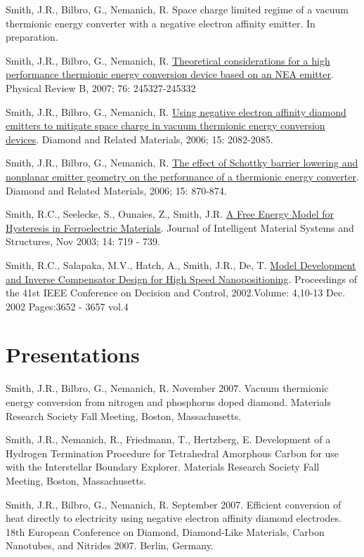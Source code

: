 \documentclass[letterpaper,margin,line]{res}
\begin{document}
\begin{resume}
Smith, J.R., Bilbro, G., Nemanich, R. Space charge limited regime of a vacuum thermionic energy converter with a negative electron affinity emitter. In preparation.

Smith, J.R., Bilbro, G., Nemanich, R. \href{http://dx.doi.org/10.1103/PhysRevB.76.245327}{Theoretical considerations for a high performance thermionic energy conversion device based on an NEA emitter}. Physical Review B, 2007; 76: 245327-245332

Smith, J.R., Bilbro, G., Nemanich, R. \href{http://dx.doi.org/10.1016/j.diamond.2006.09.011}{Using negative electron affinity diamond emitters to mitigate space charge in vacuum thermionic energy conversion devices}. Diamond and Related Materials, 2006; 15: 2082-2085.

Smith, J.R., Bilbro, G., Nemanich, R. \href{http://dx.doi.org/10.1016/j.diamond.2005.12.057}{The effect of Schottky barrier lowering and nonplanar emitter geometry on the performance of a thermionic energy converter}. Diamond and Related Materials, 2006; 15: 870-874.

Smith, R.C., Seelecke, S., Ounaies, Z., Smith, J.R. \href{http://dx.doi.org/10.1177/1045389X03038841}{A Free Energy Model for Hysteresis in Ferroelectric Materials}. Journal of Intelligent Material Systems and Structures, Nov 2003;  14:  719 - 739.

Smith, R.C., Salapaka, M.V., Hatch, A., Smith, J.R., De, T. \href{http://dx.doi.org/10.1109/CDC.2002.1184930}{Model Development and Inverse Compensator Design for High Speed Nanopositioning}. Proceedings of the 41st IEEE Conference on Decision and Control, 2002.Volume: 4,10-13 Dec. 2002 Pages:3652  - 3657 vol.4


\section{\sc Presentations}
Smith, J.R., Bilbro, G., Nemanich, R. November 2007. Vacuum thermionic energy conversion from nitrogen and phosphorus doped diamond. Materials Research Society Fall Meeting, Boston, Massachusetts.

Smith, J.R., Nemanich, R., Friedmann, T., Hertzberg, E. Development of a Hydrogen Termination Procedure for Tetrahedral Amorphous Carbon for use with the Interstellar Boundary Explorer. Materials Research Society Fall Meeting, Boston, Massachusetts.

Smith, J.R., Bilbro, G., Nemanich, R. September 2007. Efficient conversion of heat directly to electricity using negative electron affinity diamond electrodes. 18th European Conference on Diamond, Diamond-Like Materials, Carbon Nanotubes, and Nitrides 2007. Berlin, Germany.


\end{resume}
\end{document}
